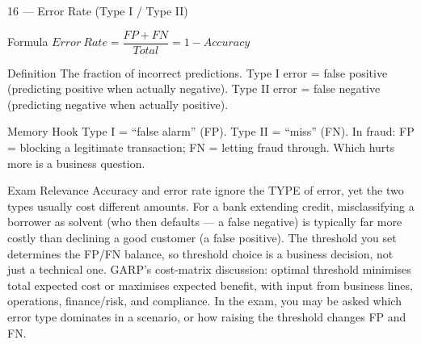 \documentclass[aspectratio=169,8pt]{beamer}
\begin{document}
	\begin{frame}{16 --- Error Rate (Type I / Type II)}
		\begin{block}{Formula}
			$Error\ Rate = \dfrac{FP + FN}{Total} = 1 - Accuracy$
		\end{block}
		\begin{block}{Definition}
			The fraction of incorrect predictions. Type I error = false positive (predicting positive when actually negative). Type II error = false negative (predicting negative when actually positive).
		\end{block}
		\begin{block}{Memory Hook}
			Type I = ``false alarm'' (FP). Type II = ``miss'' (FN). In fraud: FP = blocking a legitimate transaction; FN = letting fraud through. Which hurts more is a business question.
		\end{block}
		\begin{block}{Exam Relevance}
			Accuracy and error rate ignore the TYPE of error, yet the two types usually cost different amounts. For a bank extending credit, misclassifying a borrower as solvent (who then defaults --- a false negative) is typically far more costly than declining a good customer (a false positive). The threshold you set determines the FP/FN balance, so threshold choice is a business decision, not just a technical one. GARP's cost-matrix discussion: optimal threshold minimises total expected cost or maximises expected benefit, with input from business lines, operations, finance/risk, and compliance. In the exam, you may be asked which error type dominates in a scenario, or how raising the threshold changes FP and FN.
		\end{block}
	\end{frame}
	
\end{document}
